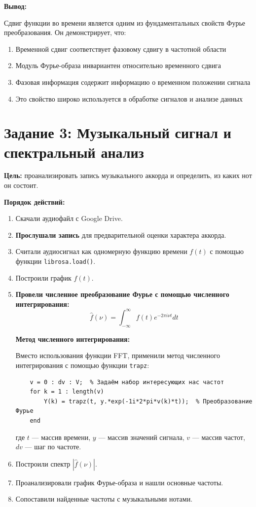 \textbf{Вывод:}

Сдвиг функции во времени является одним из фундаментальных свойств Фурье преобразования. Он демонстрирует, что:

\begin{enumerate}
    \item Временной сдвиг соответствует фазовому сдвигу в частотной области
    \item Модуль Фурье-образа инвариантен относительно временного сдвига
    \item Фазовая информация содержит информацию о временном положении сигнала
    \item Это свойство широко используется в обработке сигналов и анализе данных
\end{enumerate}

\section*{Задание 3: Музыкальный сигнал и спектральный анализ}

\textbf{Цель:} проанализировать запись музыкального аккорда и определить, из каких нот он состоит.

\textbf{Порядок действий:}

\begin{enumerate}
    \item Скачали аудиофайл с Google Drive.
    \item \textbf{Прослушали запись} для предварительной оценки характера аккорда.
    \item Считали аудиосигнал как одномерную функцию времени $f(t)$ с помощью функции \texttt{librosa.load()}.
    \item Построили график $f(t)$.
    \item \textbf{Провели численное преобразование Фурье с помощью численного интегрирования:}
    \[
    \hat{f}(\nu) = \int_{-\infty}^{\infty} f(t) e^{-2\pi i \nu t} dt
    \]
    
    \textbf{Метод численного интегрирования:}
    
    Вместо использования функции FFT, применили метод численного интегрирования с помощью функции \texttt{trapz}:
    \begin{verbatim}
    v = 0 : dv : V;  % Задаём набор интересующих нас частот
    for k = 1 : length(v)
        Y(k) = trapz(t, y.*exp(-1i*2*pi*v(k)*t));  % Преобразование Фурье
    end
    \end{verbatim}
    
    где $t$ — массив времени, $y$ — массив значений сигнала, $v$ — массив частот, $dv$ — шаг по частоте.
    
    \item Построили спектр $|\hat{f}(\nu)|$.
    \item Проанализировали график Фурье-образа и нашли основные частоты.
    \item Сопоставили найденные частоты с музыкальными нотами.
\end{enumerate}


